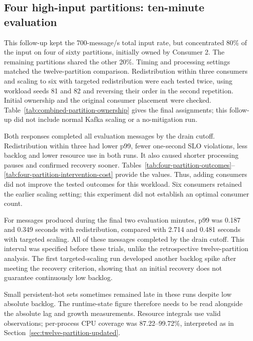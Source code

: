 \subsection{Four high-input partitions: ten-minute evaluation}\label{sec:four-partition-updated}
This follow-up kept the 700-message/s total input rate, but concentrated 80\% of the input on four of sixty partitions, initially owned by Consumer 2. The remaining partitions shared the other 20\%. Timing and processing settings matched the twelve-partition comparison. Redistribution within three consumers and scaling to six with targeted redistribution were each tested twice, using workload seeds 81 and 82 and reversing their order in the second repetition. Initial ownership and the original consumer placement were checked. Table~\ref{tab:combined-partition-ownership} gives the final assignments; this follow-up did not include normal Kafka scaling or a no-mitigation run.

Both responses completed all evaluation messages by the drain cutoff. Redistribution within three had lower p99, fewer one-second SLO violations, less backlog and lower resource use in both runs. It also caused shorter processing pauses and confirmed recovery sooner. Tables~\ref{tab:four-partition-outcomes}--\ref{tab:four-partition-intervention-cost} provide the values. Thus, adding consumers did not improve the tested outcomes for this workload. Six consumers retained the earlier scaling setting; this experiment did not establish an optimal consumer count.

For messages produced during the final two evaluation minutes, p99 was 0.187 and 0.349 seconds with redistribution, compared with 2.714 and 0.481 seconds with targeted scaling. All of these messages completed by the drain cutoff. This interval was specified before these trials, unlike the retrospective twelve-partition analysis. The first targeted-scaling run developed another backlog spike after meeting the recovery criterion, showing that an initial recovery does not guarantee continuously low backlog.

Small persistent-hot sets sometimes remained late in these runs despite low absolute backlog. The runtime-state figure therefore needs to be read alongside the absolute lag and growth measurements. Resource integrals use valid observations; per-process CPU coverage was 87.22--99.72\%, interpreted as in Section~\ref{sec:twelve-partition-updated}.

